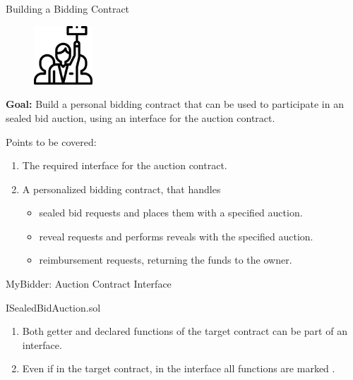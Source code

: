 \documentclass[handout]{beamer}
\begin{document}
\begin{frame}{Building a Bidding Contract}

\begin{minipage}{0.3\textwidth}
	\begin{figure}
		\center
		\includegraphics[width= 2.2cm]{../assets/images/bidder.png}	
	\end{figure}
\end{minipage}
\begin{minipage}{0.65\textwidth}
	\vspace{0.5em}
	\textbf{Goal:} Build a personal bidding contract that can be used to participate in an sealed bid auction, using an interface for the auction contract.\\
\end{minipage}

\vspace{2em}

Points to be covered:
\vspace{0.5em}
\begin{enumerate}
	\item	The required interface for the auction contract.
	\item	A personalized bidding contract, that handles
	\vspace{0.5em}
	\begin{itemize}
		\item sealed bid requests and places them with a specified auction.
		\item reveal requests and performs reveals with the specified auction.
		\item reimbursement requests, returning the funds to the owner.
	\end{itemize}
\end{enumerate}


\end{frame}


\begin{frame}{MyBidder: Auction Contract Interface}

\begin{samplecode}{ISealedBidAuction.sol}
	
\end{samplecode}
\begin{enumerate}
	\item	Both getter and declared functions of the target contract can be part of an interface.
	\item	Even if  in the target contract, in the interface all functions are marked .
\end{enumerate}

\end{frame}
\end{document}
